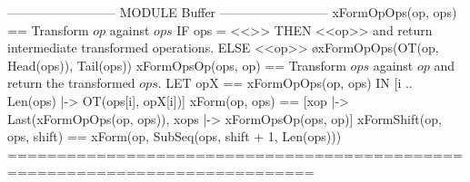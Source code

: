 \documentclass[preview, border={5pt 0pt 5pt 1pt}]{standalone}
\begin{document}
\begin{tla}
-------------------------- MODULE Buffer --------------------------
xFormOpOps(op, ops) == \* Transform $op$ against $ops$
    IF ops = <<>> THEN <<op>> \* and return intermediate transformed operations.
    ELSE <<op>> \o xFormOpOps(OT(op, Head(ops)), Tail(ops))
xFormOpsOp(ops, op) == \* Transform $ops$ against $op$ and return the transformed $ops$.
    LET opX == xFormOpOps(op, ops)
    IN  [i  .. Len(ops) |-> OT(ops[i], opX[i])]
xForm(op, ops) ==
    [xop |-> Last(xFormOpOps(op, ops)), xops |-> xFormOpsOp(ops, op)]
xFormShift(op, ops, shift) == xForm(op, SubSeq(ops, shift + 1, Len(ops)))
=============================================================================
\end{tla}
\begin{tlatex}
\@x{}\moduleLeftDash{}\moduleRightDash\@xx{}%
%
%
\@xx{}%
%
\@xx{}%
%
%
\@xx{}%
%
%
\@x{}\bottombar\@xx{}%
\end{tlatex}
\end{document}
